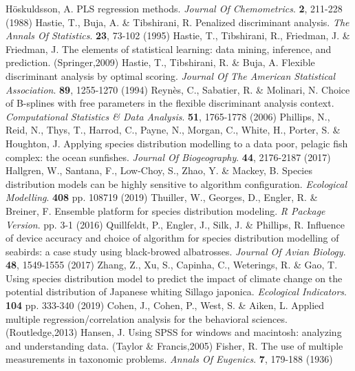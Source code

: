 \documentclass[sn-mathphys-num]{sn-jnl}%
\begin{document}
\begin{thebibliography}{000}
Höskuldsson, A. PLS regression methods. {\em Journal Of Chemometrics}. \textbf{2}, 211-228 (1988)
Hastie, T., Buja, A. \& Tibshirani, R. Penalized discriminant analysis. {\em The Annals Of Statistics}. \textbf{23}, 73-102 (1995)
Hastie, T., Tibshirani, R., Friedman, J. \& Friedman, J. The elements of statistical learning: data mining, inference, and prediction. (Springer,2009)
Hastie, T., Tibshirani, R. \& Buja, A. Flexible discriminant analysis by optimal scoring. {\em Journal Of The American Statistical Association}. \textbf{89}, 1255-1270 (1994)
Reynès, C., Sabatier, R. \& Molinari, N. Choice of B-splines with free parameters in the flexible discriminant analysis context. {\em Computational Statistics & Data Analysis}. \textbf{51}, 1765-1778 (2006)
Phillips, N., Reid, N., Thys, T., Harrod, C., Payne, N., Morgan, C., White, H., Porter, S. \& Houghton, J. Applying species distribution modelling to a data poor, pelagic fish complex: the ocean sunfishes. {\em Journal Of Biogeography}. \textbf{44}, 2176-2187 (2017)
Hallgren, W., Santana, F., Low-Choy, S., Zhao, Y. \& Mackey, B. Species distribution models can be highly sensitive to algorithm configuration. {\em Ecological Modelling}. \textbf{408} pp. 108719 (2019)
Thuiller, W., Georges, D., Engler, R. \& Breiner, F. Ensemble platform for species distribution modeling. {\em R Package Version}. pp. 3-1 (2016)
Quillfeldt, P., Engler, J., Silk, J. \& Phillips, R. Influence of device accuracy and choice of algorithm for species distribution modelling of seabirds: a case study using black-browed albatrosses. {\em Journal Of Avian Biology}. \textbf{48}, 1549-1555 (2017)
Zhang, Z., Xu, S., Capinha, C., Weterings, R. \& Gao, T. Using species distribution model to predict the impact of climate change on the potential distribution of Japanese whiting Sillago japonica. {\em Ecological Indicators}. \textbf{104} pp. 333-340 (2019)
Cohen, J., Cohen, P., West, S. \& Aiken, L. Applied multiple regression/correlation analysis for the behavioral sciences. (Routledge,2013)
Hansen, J. Using SPSS for windows and macintosh: analyzing and understanding data. (Taylor & Francis,2005)
Fisher, R. The use of multiple measurements in taxonomic problems. {\em Annals Of Eugenics}. \textbf{7}, 179-188 (1936)

\end{thebibliography}
\end{document}
